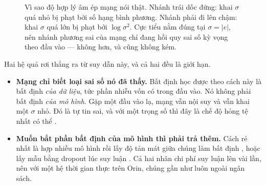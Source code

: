 \documentclass[../../deep_learning.tex]{subfiles}
\begin{document}
\begin{figure}[H]\centering
{}
\caption{Vì sao độ hợp lý âm ép mạng nói thật. Nhánh trái dốc đứng: khai \(\sigma\) quá nhỏ bị phạt bởi số hạng bình phương. Nhánh phải đi lên chậm: khai \(\sigma\) quá lớn bị phạt bởi \(\log \sigma^2\). Cực tiểu nằm đúng tại \(\sigma = |e|\), nên nhánh phương sai của mạng chỉ đang hồi quy sai số kỳ vọng theo đầu vào --- không hơn, và cũng không kém.}
\label{fig:f34-nll}
\end{figure}

Hai hệ quả rơi thẳng ra từ suy dẫn này, và cả hai đều là giới hạn.

\begin{itemize}
\item \textbf{Mạng chỉ biết loại sai số nó đã thấy.} Bất định học được theo cách này là bất định \emph{của dữ liệu}, tức phần nhiễu vốn có trong đầu vào. Nó không phải bất định \emph{của mô hình}. Gặp một đầu vào lạ, mạng vẫn nội suy và vẫn khai một \(\sigma\) nhỏ. Đó là tự tin sai, và với một trọng số thì đây là chế độ hỏng tệ nhất có thể \cite{kendall2017uncertainties}.
\item \textbf{Muốn bắt phần bất định của mô hình thì phải trả thêm.} Cách rẻ nhất là hợp nhiều mô hình rồi lấy độ tản mát giữa chúng làm bất định \cite{lakshminarayanan2017simple}, hoặc lấy mẫu bằng dropout lúc suy luận \cite{gal2016dropout}. Cả hai nhân chi phí suy luận lên vài lần, nên với một hệ thời gian thực trên Orin, chúng gần như luôn ngoài ngân sách.
\end{itemize}
\end{document}
